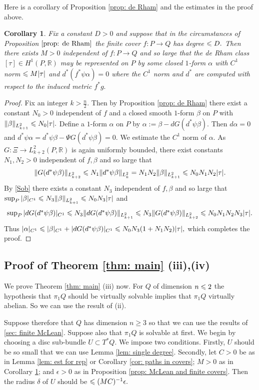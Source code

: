 \documentclass{article}
\theoremstyle{plain}%
\newtheorem{cor}[thm]{Corollary}
\theoremstyle{definition}
\numberwithin{equation}{section}
\numberwithin{figure}{section}
\def\eq{\eqref}
\def\l{\label}
\def\ge{\geqslant}
\def\le{\leqslant\nobreak}
\def\R{{\mathbin{\mathbb R}}}
\def\al{\alpha}
\def\be{\beta}
\def\de{\delta}
\def\ep{\epsilon}
\def\ps{\psi}
\def\Ps{\Psi}
\def\ta{\tau}
\def\ts{\textstyle}
\begin{document}
Here is a corollary of Proposition \ref{prop: de Rham} and the estimates in the proof above.
\begin{cor}\l{cor: de Rham}
Fix a constant $D>0$ and suppose that in the circumstances of Proposition $\ref{prop: de Rham}$ the finite cover $f:P\to Q$ has degree $\le D.$ Then there exists $M>0$ independent of $f:P\to Q$ and so large that the de Rham class $[\ta]\in H^1(P,\R)$ may be represented on $P$ by some closed $1$-form $\al$ with $C^1$ norm $\le M|\tau|$ and $d^*(f^*\ps \al)=0$ where the $C^1$ norm and $d^*$ are computed with respect to the induced metric $f^*g.$
\end{cor}
\begin{proof}
Fix an integer $k>\frac n2.$ Then by Proposition \ref{prop: de Rham} there exist a constant $N_0>0$ independent of $f$ and a closed smooth $1$-form $\be$ on $P$ with $\|\be\|_{L^2_{k+1}}\le N_0|\tau|.$
Define a $1$-form $\al$ on $P$ by 
$\al:= \be- d G(d^*\ps\be).$
Then $d \al=0$ and $d^*\ps\al=d^*\ps\be-\Ps G(d^*\ps\be)=0.$
We estimate the $C^1$ norm of $\al.$
As $G:\Xi\to L^2_{k+2}(P,\R)$ is again uniformly bounded, there exist constants $N_1,N_2>0$ independent of $f,\be$ and so large that 
\[ \|G(d^*\ps\be)\|_{L^2_{k+2}} \le N_1 \|d^*\ps\be\|_{L^2_k}=N_1N_2\|\be\|_{L^2_{k+1}}\le N_0N_1N_2|\tau|. \]
By \eq{Sob} there exists a constant $N_3$ independent of $f,\be$ and so large that $\sup_P|\be|_{C^1}\le N_3 \|\be\|_{L^2_{k+1}}\le N_0N_3|\tau|$ and
\[ \ts \sup_P|d G(d^*\ps\be)|_{C^1}\le  N_3\|d G(d^*\ps\be)\|_{L^2_{k+1}}\le
N_3\|G(d^*\ps\be)\|_{L^2_{k+2}}\le  N_0N_1N_2N_3|\tau|.\]
Thus $|\al|_{C^1}\le |\be|_{C^1}+ 
|d G(d^*\ps\be)|_{C^1}\le N_0N_3(1+N_1N_2)|\tau|,$ which completes the proof. 
\end{proof}


\subsection{Proof of Theorem \ref{thm: main} (iii),(iv)}\l{sec: proof main iii iv}
We prove Theorem \ref{thm: main} (iii) now. For $Q$ of dimension $n\le2$ the hypothesis that $\pi_1Q$ should be virtually solvable implies that $\pi_1Q$ virtually abelian. So we can use the result of (ii).  

Suppose therefore that $Q$ has dimension $n\ge3$ so that we can use the results of \ref{sec: finite McLean}. Suppose also that $\pi_1Q$ is solvable at first. We begin by choosing a disc sub-bundle $U\subset T^*Q.$ We impose two conditions. Firstly, $U$ should be so small that we can use Lemma \ref{lem: single degree}. Secondly, let $C>0$ be as in Lemma \ref{lem: est for rep} or Corollary \ref{cor: paths in covers}; $M>0$ as in Corollary \ref{cor: de Rham}; and $\ep>0$ as in Proposition \ref{prop: McLean and finite covers}. Then the radius $\de$ of $U$ should be $\le (MC)^{-1}\ep.$
\end{document}

